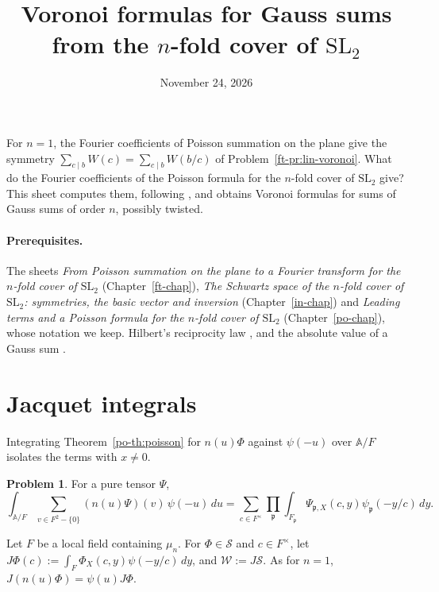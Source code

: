 \documentclass[reqno]{amsart}
\title[Voronoi formulas from the $n$-fold cover]{Voronoi formulas for Gauss
  sums from the $n$-fold cover of $\mathrm{SL}_2$}
\author{}
\date{November 24, 2026}
\newcommand{\SL}{\mathrm{SL}_2}
\newcommand{\Sc}{\mathcal{S}}
\newcommand{\Wc}{\mathcal{W}}
\newcommand{\Ab}{\mathbb{A}}
\newcommand{\pp}{\mathfrak{p}}
\newcounter{chap}
\numberwithin{equation}{section}
\theoremstyle{definition}
\newtheorem{problem}{Problem}[section]
\theoremstyle{plain}
\begin{document}
\maketitle
{}\label{chap}

For $n = 1$, the Fourier coefficients of Poisson summation on the plane give the symmetry $\sum_{c \mid b} W(c) = \sum_{c \mid b} W(b / c)$ of Problem~\ref{ft-pr:lin-voronoi}.  What do the Fourier coefficients of the Poisson formula for the $n$-fold cover of $\SL$ give?  This sheet computes them, following \cite{N}, and obtains Voronoi formulas for sums of Gauss sums of order $n$, possibly twisted.

\paragraph{Prerequisites.}
The sheets \emph{From Poisson summation on the plane to a Fourier transform for the $n$-fold cover of $\mathrm{SL}_2$} (Chapter~\ref{ft-chap}), \emph{The Schwartz space of the $n$-fold cover of $\mathrm{SL}_2$: symmetries, the basic vector and inversion} (Chapter~\ref{in-chap}) and \emph{Leading terms and a Poisson formula for the $n$-fold cover of $\mathrm{SL}_2$} (Chapter~\ref{po-chap}), whose notation we keep.  Hilbert's reciprocity law \cite[Ch.~VI, Theorem~8.1]{Neu}, and the absolute value of a Gauss sum \cite[\S23.6]{BH}.


\section{Jacquet integrals}\label{sec:jacquet}

Integrating Theorem~\ref{po-th:poisson} for $n(u) \Phi$ against $\psi(-u)$ over $\Ab / F$ isolates the terms with $x \neq 0$.

\begin{problem}\label{pr:fourier-coeff}
  For a pure tensor $\Psi$,
  \begin{equation*}
    \int_{\Ab / F} \sum_{v \in F^2 - \{0\}} (n(u) \Psi)(v) \, \psi(-u) \, d u
    = \sum_{c \in F^\times} \prod_\pp \int_{F_\pp} \Psi_{\pp, X}(c, y) \psi_\pp(- y / c) \, d y.
  \end{equation*}
\end{problem}

Let $F$ be a local field containing $\mu_n$.  For $\Phi \in \Sc$ and $c \in F^\times$, let $J \Phi(c) := \int_F \Phi_X(c, y) \psi(- y / c) \, d y$, and $\Wc := J \Sc$.  As for $n = 1$, $J(n(u) \Phi) = \psi(u) J \Phi$.
\end{document}

